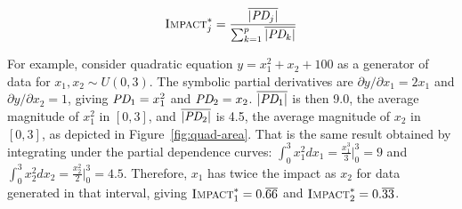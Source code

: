 \documentclass[11pt]{article}
\newcommand{\figref}[1]{Figure~\ref{#1}}
\newcommand{\Imp}{\fontfamily{cmr}\textsc{Impact}}
\begin{document}
\begin{equation}\label{eq:Epd2a}
\Imp_j^{*} = \frac{\overline{|\text{\it PD}_j|}}{\sum_{k=1}^p \overline{|\text{\it PD}_k|}}
\end{equation}

\noindent For example, consider quadratic equation $y = x_1^2 + x_2 + 100$ as a generator of data for $x_1, x_2 \sim U(0,3)$. The symbolic partial derivatives are ${\partial y}/{\partial x_1} = 2 x_1$ and ${\partial y}/{\partial x_2} = 1$, giving $\text{\it PD}_1 = x_1^2$ and $\text{\it PD}_2 = x_2$. $\overline{|\text{\it PD}_1|}$ is then 9.0, the average magnitude of $x_1^2$ in $[0,3]$, and $\overline{|\text{\it PD}_2|}$ is 4.5, the average magnitude of $x_2$ in $[0,3]$, as depicted in \figref{fig:quad-area}. That is the same result obtained by integrating under the partial dependence curves:  $\int_0^3 x_1^2 dx_1 = \frac{x_1^3}{3} \big |_0^3 = 9$ and $\int_0^3 x_2^2 dx_2 = \frac{x_2^2}{2} \big |_0^3 = 4.5$.   Therefore, $x_1$ has twice the impact as $x_2$ for data generated in that interval, giving $\Imp_1^{*} = 0.\overline{66}$ and $\Imp_2^{*} = 0.\overline{33}$.
\end{document}
